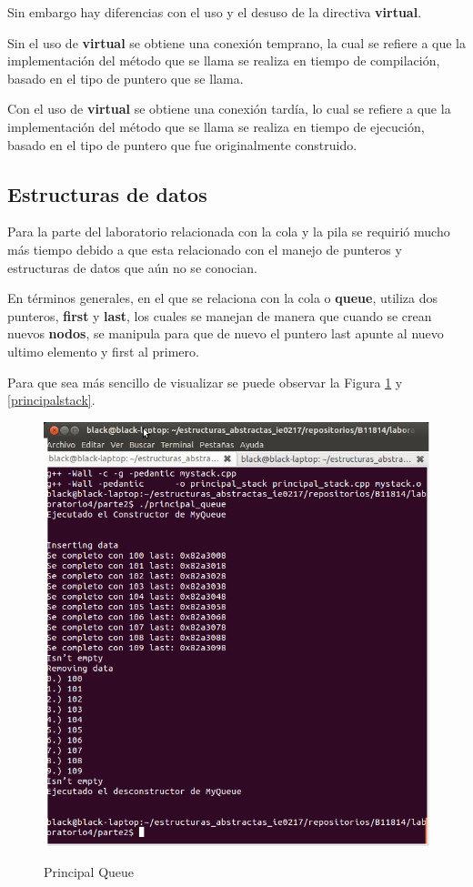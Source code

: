 \documentclass{article}
\begin{document}
Sin embargo hay diferencias con el uso y el desuso de la directiva \textbf{virtual}.

Sin el uso de \textbf{virtual} se obtiene una conexi\' on temprano, la cual se refiere a que la implementaci\' on del m\' etodo que se llama se realiza en tiempo de compilaci\' on, basado en el tipo de puntero que se llama.

Con el uso de \textbf{virtual} se obtiene una conexi\' on tard\' ia, lo cual se refiere a que la implementaci\' on del m\' etodo que se llama se realiza en tiempo de ejecuci\' on, basado en el tipo de puntero que fue originalmente construido.



\subsection{Estructuras de datos}
Para la parte del laboratorio relacionada con la cola y la pila se requiri\' o mucho m\' as tiempo debido a que esta relacionado con el manejo de punteros y estructuras de datos que a\' un no se conocian.

En t\' erminos generales, en el que se relaciona con la cola o \textbf{queue}, utiliza dos punteros, \textbf{first} y \textbf{last}, los cuales se manejan de manera que cuando se crean nuevos \textbf{nodos}, se manipula para que de nuevo el puntero last apunte al nuevo ultimo elemento y first al primero. 

Para que sea m\' as sencillo de visualizar se puede observar la Figura \ref{fig:principalqueue} y \ref{principalstack}.

\begin{figure}[H]
\caption{Principal Queue}
\includegraphics[scale=0.6]{./imagenes/principalqueue.png}
\label{fig:principalqueue}
\end{figure}
\end{document}

